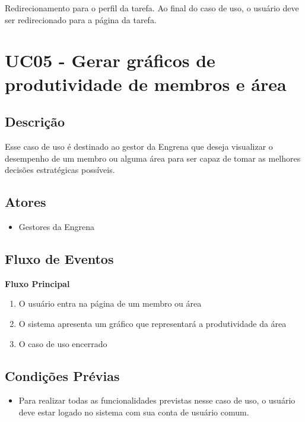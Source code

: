 \begin{apendicesenv}
Redirecionamento para o perfil da tarefa. Ao final do caso de uso, o usuário deve ser redirecionado para a página da tarefa.


\section{UC05 - Gerar gráficos de produtividade de membros e área}

\subsection{Descrição}

Esse caso de uso é destinado ao gestor da Engrena que deseja visualizar o desempenho de um membro ou alguma área para ser capaz de tomar as melhores decisões estratégicas possíveis.

\subsection{Atores}

\begin{itemize}
  \item{Gestores da Engrena}
\end{itemize}


\subsection{Fluxo de Eventos}


\textbf{Fluxo Principal}

\begin{enumerate}
  \item{O usuário entra na página de um membro ou área}
  \item{O sistema apresenta um gráfico que representará a produtividade da área}
  \item{O caso de uso encerrado}
\end{enumerate}

\subsection{Condições Prévias}
\begin{itemize}
\item{Para realizar todas as funcionalidades previstas nesse caso de uso, o usuário deve estar logado no sistema com sua conta de usuário comum.}
\end{itemize}




\end{apendicesenv}
